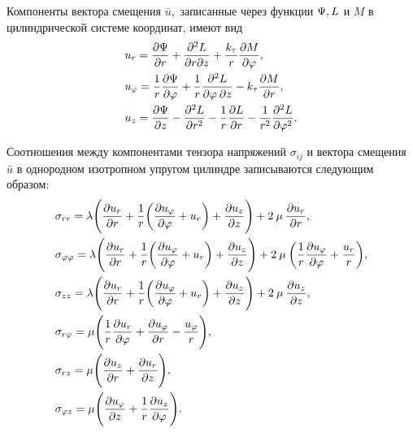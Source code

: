 Компоненты вектора смещения $\bar{u},$ записанные через функции $\P, L$ и $M$ в цилиндрической системе координат, имеют вид
\begin{align}
&u_r=\frac{\partial \P}{\partial r}+\frac{\partial^2 L}{\partial r\partial z}+\frac{k_\tau} {r}\frac{\partial M}{\partial \f},\\
&u_\f=\frac{1}{r}\frac{\partial \P}{\partial \f}+\frac{1}{r}\frac{\partial^{2} L}{\partial\f\: \partial z}-k_{\tau}\frac{\partial M}{\partial r},\\
&u_z=\frac{\partial\P}{\partial z}-\frac{\partial^{2} L}{\partial r^{2}}-\frac{1}{r}\frac{\partial L}{\partial r}-\frac{1}{r^2}\frac{\partial^{2}L}{\partial\f^{2}}.
\end{align}

Соотношения между компонентами тензора напряжений $\sigma_{ij}$ и вектора смещения $\bar{u}$ в однородном изотропном упругом цилиндре записываются следующим образом:
\begin{equation}
\begin{aligned}
&\sigma_{rr}=\lambda\Biggl(\frac{\partial u_r}{\partial r}+\frac{1}{r}\biggl(\frac{\partial u_\f}{\partial\f}+u_r\biggr)+\frac{\partial u_z}{\partial z}\Biggr)+2\:\mu\:\frac{\partial u_r}{\partial r},\\
&\sigma_{\f\f}=\lambda\Biggl(\frac{\partial u_r}{\partial r}+\frac{1}{r}\biggl(\frac{\partial u_\f}{\partial\f}+u_r\biggr)+\frac{\partial u_z}{\partial z}\Biggr)+2\:\mu\:\biggl(\frac{1}{r}\frac{\partial u_\f}{\partial\f}+\frac{u_r}{r}\biggr),\\
&\sigma_{zz}=\lambda\Biggl(\frac{\partial u_r}{\partial r}+\frac{1}{r}\biggl(\frac{\partial u_\f}{\partial\f}+u_r\biggr)+\frac{\partial u_z}{\partial z}\Biggr)+2\:\mu\:\frac{\partial u_z}{\partial z},\\
&\sigma_{r\f}=\mu\Biggl(\frac{1}{r}\frac{\partial u_r}{\partial\f}+\frac{\partial u_\f}{\partial r}-\frac{u_{\f}}{r}\Biggr),\\
&\sigma_{rz}=\mu\Biggl(\frac{\partial u_z}{\partial r}+\frac{\partial u_r}{\partial z}\Biggr),\\
&\sigma_{\f z}=\mu\Biggl(\frac{\partial u_\f}{\partial z}+\frac{1}{r}\frac{\partial u_z}{\partial \f}\Biggr).
\end{aligned}
\end{equation}

